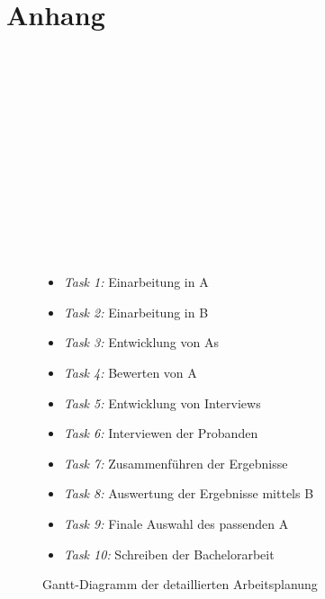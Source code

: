 \chapter{Anhang}\label{ch:anhang}
\begin{figure}[H]
    \begin{ganttchart}{1}{14}
         \\
         \\
         \\
         \\
         \\
         \\
         \\
         \\
         \\
         \\
         \\
         \\
        \label{fig:gantchart}
    \end{ganttchart}
    \caption{Gantt-Diagramm der detaillierten Arbeitsplanung}
    \begin{itemize}
        \item \textit{Task 1:} Einarbeitung in A
        \item \textit{Task 2:} Einarbeitung in B
        \item \textit{Task 3:} Entwicklung von As
        \item \textit{Task 4:} Bewerten von A
        \item \textit{Task 5:} Entwicklung von Interviews
        \item \textit{Task 6:} Interviewen der Probanden
        \item \textit{Task 7:} Zusammenführen der Ergebnisse
        \item \textit{Task 8:} Auswertung der Ergebnisse mittels B
        \item \textit{Task 9:} Finale Auswahl des passenden A
        \item \textit{Task 10:} Schreiben der Bachelorarbeit
    \end{itemize}
\end{figure}
